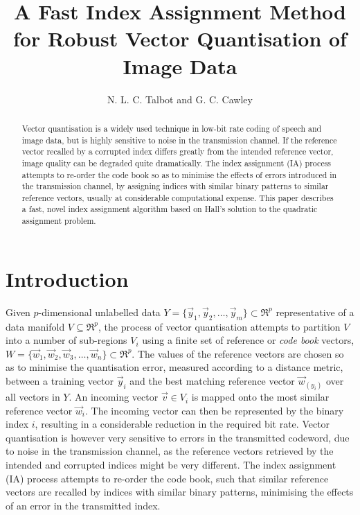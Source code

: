 \documentclass[a4paper]{report}
\begin{document}
\title{A Fast Index Assignment Method for Robust Vector Quantisation of Image Data}
\author{N. L. C. Talbot and G. C. Cawley}
\maketitle

\tableofcontents
\begin{abstract}

Vector quantisation is a widely used technique in low-bit rate coding of speech
and image data, but is highly sensitive to noise in the transmission channel.
If the reference vector recalled by a corrupted index differs greatly from the
intended reference vector, image quality can be degraded quite dramatically.
The index assignment (IA) process attempts to re-order the code book so as to
minimise the effects of errors introduced in the transmission channel, by
assigning indices with similar binary patterns to similar reference vectors,
usually at considerable computational expense.  This paper describes a fast,
novel index assignment algorithm based on Hall's solution to the quadratic
assignment problem.
\end{abstract}

\chapter{Introduction}

Given $p$-dimensional unlabelled data
$Y = \{\vec{y}_1, \vec{y}_2, \ldots, \vec{y}_m\}\subset\Re^p$ representative
of a data manifold $V \subseteq\Re^p$, the process
of vector quantisation attempts to partition $V$ into a number
of sub-regions $V_i$ using a finite set of reference or \emph{code book}
vectors, $W = \{\vec{w}_1, \vec{w}_2, \vec{w}_3, \ldots, \vec{w}_n\}
\subset\Re^p$.  The values of the reference vectors are chosen so as
to minimise the quantisation error, measured according to a distance metric,
between a training vector $\vec{y}_i$ and the best matching reference vector
$\vec{w}_{(y_i)}$ over all vectors in $Y$.  An incoming vector
$\vec{v} \in V_i$ is mapped onto the most similar reference vector
$\vec{w}_i$.  The incoming vector can then be represented by the binary index $i$,
resulting in a considerable reduction in the required bit rate.
Vector quantisation is however very sensitive to errors in the transmitted
codeword, due to noise in the transmission channel, as the reference vectors
retrieved by the intended and corrupted indices might be very different.  The
index assignment (IA) process attempts to re-order the code book, such that
similar reference vectors are recalled by indices with similar binary
patterns, minimising the effects of an error in the
transmitted index.
\end{document}
